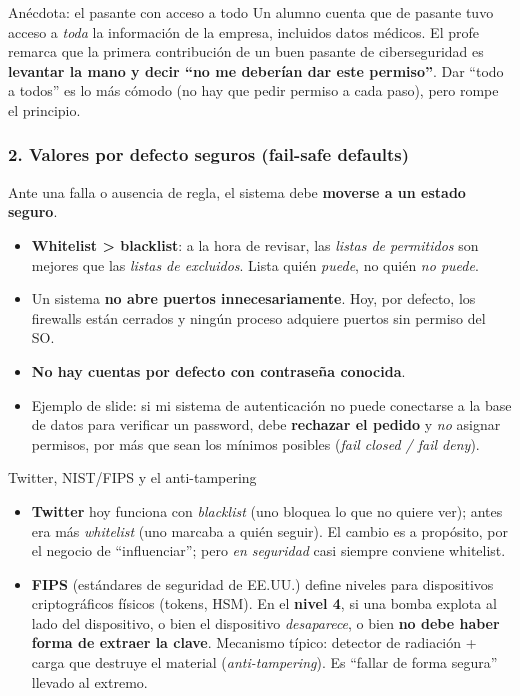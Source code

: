 \documentclass[11pt,a4paper]{article}
\begin{document}
\begin{practbox}{Anécdota: el pasante con acceso a todo}
Un alumno cuenta que de pasante tuvo acceso a \emph{toda} la información de la empresa,
incluidos datos médicos. El profe remarca que la primera contribución de un buen pasante de
ciberseguridad es \textbf{levantar la mano y decir ``no me deberían dar este permiso''}. Dar
``todo a todos'' es lo más cómodo (no hay que pedir permiso a cada paso), pero rompe el
principio.
\end{practbox}

\subsubsection{2. Valores por defecto seguros (fail-safe defaults)}
Ante una falla o ausencia de regla, el sistema debe \textbf{moverse a un estado seguro}.
\begin{itemize}[leftmargin=1.4em,itemsep=1pt]
  \item \textbf{Whitelist > blacklist}: a la hora de revisar, las \emph{listas de permitidos}
        son mejores que las \emph{listas de excluidos}. Lista quién \emph{puede}, no quién
        \emph{no puede}.
  \item Un sistema \textbf{no abre puertos innecesariamente}. Hoy, por defecto, los firewalls
        están cerrados y ningún proceso adquiere puertos sin permiso del SO.
  \item \textbf{No hay cuentas por defecto con contraseña conocida}.
  \item Ejemplo de slide: si mi sistema de autenticación no puede conectarse a la base de
        datos para verificar un password, debe \textbf{rechazar el pedido} y \emph{no} asignar
        permisos, por más que sean los mínimos posibles (\emph{fail closed / fail deny}).
\end{itemize}

\begin{practbox}{Twitter, NIST/FIPS y el anti-tampering}
\begin{itemize}[leftmargin=1.3em,itemsep=2pt]
  \item \textbf{Twitter} hoy funciona con \emph{blacklist} (uno bloquea lo que no quiere ver);
        antes era más \emph{whitelist} (uno marcaba a quién seguir). El cambio es a propósito,
        por el negocio de ``influenciar''; pero \emph{en seguridad} casi siempre conviene
        whitelist.
  \item \textbf{FIPS} (estándares de seguridad de EE.UU.) define niveles para dispositivos
        criptográficos físicos (tokens, HSM). En el \textbf{nivel 4}, si una bomba explota al
        lado del dispositivo, o bien el dispositivo \emph{desaparece}, o bien \textbf{no debe
        haber forma de extraer la clave}. Mecanismo típico: detector de radiación + carga que
        destruye el material (\emph{anti-tampering}). Es ``fallar de forma segura'' llevado al
        extremo.
\end{itemize}
\end{practbox}
\end{document}

